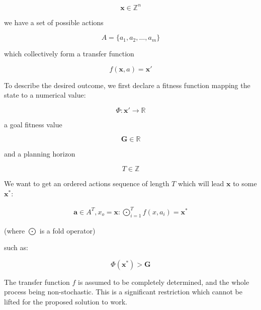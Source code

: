 \documentclass[12pt, a4paper]{report}
\begin{document}
	\begin{equation}\label{definitions:attributes-amount}
		\mathbf{x} \in \mathbb{Z}^n
	\end{equation}
	
	we have a set of possible actions
	
	\begin{equation}\label{definitions:actions-amount}
		A = \{a_1, a_2,\ldots, a_m\}
	\end{equation}
	
	which collectively form a transfer function
	
	\begin{equation}\label{definitions:transfer-function}
		f(\mathbf{x}, a) = \mathbf{x}'
	\end{equation}

	To describe the desired outcome, we first declare a fitness function mapping the state to a numerical value:
	
	\begin{equation}
		\Phi : \mathbf{x}' \rightarrow \mathbb{R}
	\end{equation} 
	
	a goal fitness value 
	
	\begin{equation}
		\mathbf{G} \in \mathbb{R}
	\end{equation}
	
	and a planning horizon
	
	\begin{equation}
		T \in \mathbb{Z}
	\end{equation}
	
	We want to get an ordered actions sequence of length $T$ which will lead $\mathbf{x}$ to some $\mathbf{x}^*$:
	
	\begin{eqnarray}\label{definitions:fold}
		\mathbf{a} \in A^T, x_o = \mathbf{x}: \bigodot_{i=1}^{T} f(x, a_i) = \mathbf{x}^*
	\end{eqnarray}
	
	(where $\bigodot$ is a fold operator)
	
	such as:
	
	\begin{equation}
		\Phi(\mathbf{x}^*) > \mathbf{G}
	\end{equation}
	
	The transfer function $f$ is assumed to be completely determined, and the whole process being non-stochastic. This is a significant restriction which cannot be lifted for the proposed solution to work.
\end{document}
